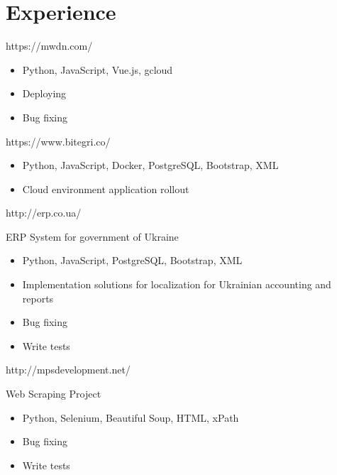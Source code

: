 \documentclass{resume}
\begin{document}



\section{Experience}


https://mwdn.com/
\begin{itemize}
  \item Python, JavaScript, Vue.js, gcloud
  \item Deploying
  \item Bug fixing
  
\end{itemize}


https://www.bitegri.co/
\begin{itemize}
  \item Python, JavaScript, Docker, PostgreSQL, Bootstrap, XML
  \item Cloud environment application rollout
  
\end{itemize}


http://erp.co.ua/

ERP System for government of Ukraine 
\begin{itemize}
  \item Python, JavaScript, PostgreSQL, Bootstrap, XML
  \item Implementation solutions for localization for Ukrainian accounting and reports
  \item Bug fixing
  \item Write tests
\end{itemize}


http://mpsdevelopment.net/

Web Scraping Project
\begin{itemize}
  \item Python, Selenium, Beautiful Soup, HTML, xPath
  \item Bug fixing
  \item Write tests
\end{itemize}
\end{document}
